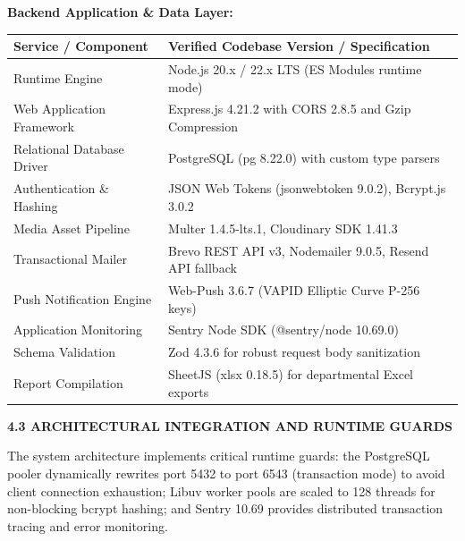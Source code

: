 {\vspace{0.2cm}
\noindent\textbf{Backend Application \& Data Layer:}
\begin{table}[H]
  \centering
  \fontsize{11pt}{15.5pt}\selectfont
  \begin{tabularx}{\textwidth}{@{}p{5.5cm} L@{}}
    \textbf{Service / Component} & \textbf{Verified Codebase Version / Specification} \\
    \midrule
    Runtime Engine & Node.js 20.x / 22.x LTS (ES Modules runtime mode) \\
    Web Application Framework & Express.js 4.21.2 with CORS 2.8.5 and Gzip Compression \\
    Relational Database Driver & PostgreSQL (pg 8.22.0) with custom type parsers \\
    Authentication \& Hashing & JSON Web Tokens (jsonwebtoken 9.0.2), Bcrypt.js 3.0.2 \\
    Media Asset Pipeline & Multer 1.4.5-lts.1, Cloudinary SDK 1.41.3 \\
    Transactional Mailer & Brevo REST API v3, Nodemailer 9.0.5, Resend API fallback \\
    Push Notification Engine & Web-Push 3.6.7 (VAPID Elliptic Curve P-256 keys) \\
    Application Monitoring & Sentry Node SDK (@sentry/node 10.69.0) \\
    Schema Validation & Zod 4.3.6 for robust request body sanitization \\
    Report Compilation & SheetJS (xlsx 0.18.5) for departmental Excel exports \\
    \bottomrule
  \end{tabularx}
\end{table}

\vspace{0.4cm}
{\fontsize{14pt}{18pt}\selectfont\bfseries 4.3 ARCHITECTURAL INTEGRATION AND RUNTIME GUARDS\par}
\vspace{0.3cm}

The system architecture implements critical runtime guards: the PostgreSQL pooler dynamically rewrites port 5432 to port 6543 (transaction mode) to avoid client connection exhaustion; Libuv worker pools are scaled to 128 threads for non-blocking bcrypt hashing; and Sentry 10.69 provides distributed transaction tracing and error monitoring.\par}
\newpage
